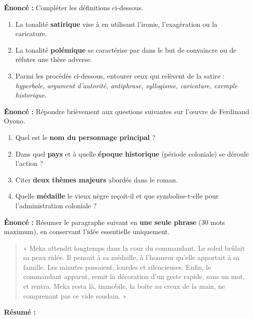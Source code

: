 \documentclass[11pt]{article}
\begin{document}
\begin{exercice}
\textbf{Énoncé :} Compléter les définitions ci-dessous.
\begin{enumerate}
    \item La tonalité \textbf{satirique} vise à \underline{\hspace{5cm}} en utilisant l'ironie, l'exagération ou la caricature.
    \item La tonalité \textbf{polémique} se caractérise par \underline{\hspace{5cm}} dans le but de convaincre ou de réfuter une thèse adverse.
    \item Parmi les procédés ci-dessous, entourer ceux qui relèvent de la satire : \textit{hyperbole, argument d'autorité, antiphrase, syllogisme, caricature, exemple historique}.
\end{enumerate}
\end{exercice}

\begin{exercice}
\textbf{Énoncé :} Répondre brièvement aux questions suivantes sur l'œuvre de Ferdinand Oyono.
\begin{enumerate}
    \item Quel est le \textbf{nom du personnage principal} ?
    \item Dans quel \textbf{pays} et à quelle \textbf{époque historique} (période coloniale) se déroule l'action ?
    \item Citer \textbf{deux thèmes majeurs} abordés dans le roman.
    \item Quelle \textbf{médaille} le vieux nègre reçoit-il et que symbolise-t-elle pour l'administration coloniale ?
\end{enumerate}
\end{exercice}

\begin{exercice}
\textbf{Énoncé :} Résumer le paragraphe suivant en \textbf{une seule phrase} (30 mots maximum), en conservant l'idée essentielle uniquement.

\begin{quote}
« Meka attendit longtemps dans la cour du commandant. Le soleil brûlait sa peau ridée. Il pensait à sa médaille, à l'honneur qu'elle apportait à sa famille. Les minutes passaient, lourdes et silencieuses. Enfin, le commandant apparut, remit la décoration d'un geste rapide, sans un mot, et rentra. Meka resta là, immobile, la boîte au creux de la main, ne comprenant pas ce vide soudain. »
\end{quote}

\vspace{0.5cm}
\textbf{Résumé :} \underline{\hspace{16cm}}
\end{exercice}
\end{document}
